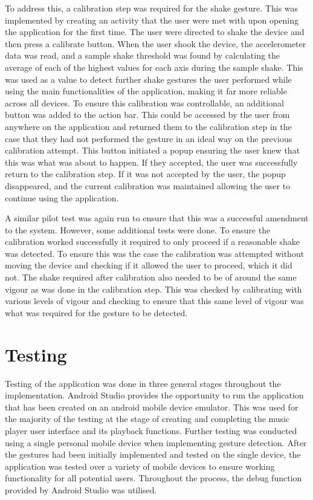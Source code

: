 \documentclass{l4proj}
\begin{document}
To address this, a calibration step was required for the shake gesture. This was implemented by creating an activity that the user were met with upon opening the application for the first time. The user were directed to shake the device and then press a calibrate button. When the user shook the device, the accelerometer data was read, and a sample shake threshold was found by calculating the average of each of the highest values for each axis during the sample shake. This was used as a value to detect further shake gestures the user performed while using the main functionalities of the application, making it far more reliable across all devices. To ensure this calibration was controllable, an additional button was added to the action bar. This could be accessed by the user from anywhere on the application and returned them to the calibration step in the case that they had not performed the gesture in an ideal way on the previous calibration attempt. This button initiated a popup ensuring the user knew that this was what was about to happen. If they accepted, the user was successfully return to the calibration step. If it was not accepted by the user, the popup disappeared, and the current calibration was maintained allowing the user to continue using the application.

A similar pilot test was again run to ensure that this was a successful amendment to the system. However, some additional tests were done. To ensure the calibration worked successfully it required to only proceed if a reasonable shake was detected. To ensure this was the case the calibration was attempted without moving the device and checking if it allowed the user to proceed, which it did not. The shake required after calibration also needed to be of around the same vigour as was done in the calibration step. This was checked by calibrating with various levels of vigour and checking to ensure that this same level of vigour was what was required for the gesture to be detected.


\section{Testing}

Testing of the application was done in three general stages throughout the implementation. Android Studio provides the opportunity to run the application that has been created on an android mobile device emulator. This was used for the majority of the testing at the stage of creating and completing the music player user interface and its playback functions. Further testing was conducted using a single personal mobile device when implementing gesture detection. After the gestures had been initially implemented and tested on the single device, the application was tested over a variety of mobile devices to ensure working functionality for all potential users. Throughout the process, the debug function provided by Android Studio was utilised.
\end{document}
